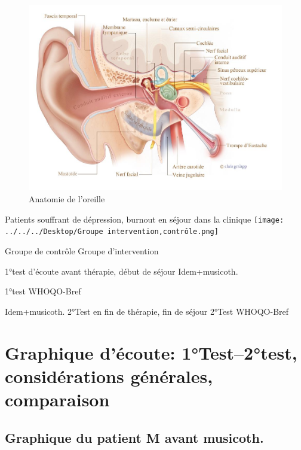         \begin{figure}
	\centering
	\includegraphics[width=1\linewidth]{images/20160624Berufsfeldgruppen.jpg}
	\caption[Anatomie oreille]{Anatomie de l'oreille}
	\label{valeriexxxx}
\end{figure}



                                      Patients souffrant de dépression, burnout
                                               en séjour dans la
                                               clinique
                                               \texttt{[image: ../../../Desktop/Groupe intervention,contrôle.png]}


        
        Groupe de contrôle                                                    Groupe
                                                                                     d'intervention

1°test d'écoute avant thérapie, début de séjour           Idem+musicoth.

1°test WHOQO-Bref

                                                                                     Idem+musicoth.
2°Test en fin de thérapie, fin de séjour
2°Test WHOQO-Bref
 
 	
\section{Graphique d'écoute: 1°Test--2°test, considérations générales,
  comparaison}
	
 	
 	\subsection{Graphique du patient M avant musicoth.}
 	
